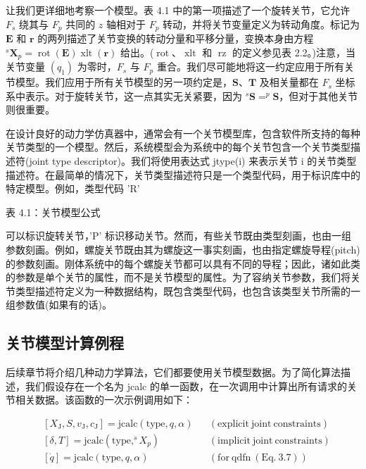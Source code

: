 \documentclass[10pt,a4paper]{book}
\theoremstyle{thmstyle} %
\theoremstyle{defstyle} %
\theoremstyle{prostyle} %
\begin{document}
让我们更详细地考察一个模型。表 4.1 中的第一项描述了一个旋转关节，它允许 $F_{s}$ 绕其与 $F_{p}$ 共同的 $z$ 轴相对于 $F_{p}$ 转动，并将关节变量定义为转动角度。标记为 $\boldsymbol{E}$ 和 $\boldsymbol{r}$ 的两列描述了关节变换的转动分量和平移分量，变换本身由方程 ${}^{s}\boldsymbol{X}_{p}=\operatorname{rot}(\boldsymbol{E}) \operatorname{xlt}(\boldsymbol{r})$ 给出。($\operatorname{rot}$、$\operatorname{xlt}$ 和 $\operatorname{rz}$ 的定义参见表 2.2。)注意，当关节变量 $(q_{1})$ 为零时，$F_{s}$ 与 $F_{p}$ 重合。我们尽可能地将这一约定应用于所有关节模型。我们应用于所有关节模型的另一项约定是，$\boldsymbol{S}$、$\boldsymbol{T}$ 及相关量都在 $F_{s}$ 坐标系中表示。对于旋转关节，这一点其实无关紧要，因为 ${}^{s}\boldsymbol{S}=^{p}\boldsymbol{S}$，但对于其他关节则很重要。



在设计良好的动力学仿真器中，通常会有一个关节模型库，包含软件所支持的每种关节类型的一个模型。然后，系统模型会为系统中的每个关节包含一个关节类型描述符(joint type descriptor)。我们将使用表达式 jtype(i) 来表示关节 i 的关节类型描述符。在最简单的情况下，关节类型描述符只是一个类型代码，用于标识库中的特定模型。例如，类型代码 'R'



表 4.1：关节模型公式





可以标识旋转关节，'P' 标识移动关节。然而，有些关节既由类型刻画，也由一组参数刻画。例如，螺旋关节既由其为螺旋这一事实刻画，也由指定螺旋导程(pitch)的参数刻画。刚体系统中的每个螺旋关节都可以具有不同的导程；因此，诸如此类的参数是单个关节的属性，而不是关节模型的属性。为了容纳关节参数，我们将关节类型描述符定义为一种数据结构，既包含类型代码，也包含该类型关节所需的一组参数值(如果有的话)。



\subsection{关节模型计算例程}





后续章节将介绍几种动力学算法，它们都要使用关节模型数据。为了简化算法描述，我们假设存在一个名为 jcalc 的单一函数，在一次调用中计算出所有请求的关节相关数据。该函数的一次示例调用如下：



$$
\begin{array}{rlrl} & { [X_{\mathrm{J}}, S, v_{\mathrm{J}}, c_{\mathrm{J}}] = \mathrm{jcalc}(\mathrm{type}, q, \alpha)} & & { \mathrm{(explicit~joint~constraints)} } \\& { [\delta, T] = \mathrm{jcalc}(\mathrm{type}, ^{s} X_{p})} & & { \mathrm{(implicit~joint~constraints)} } \\& { [\dot{q}] = \mathrm{jcalc}(\mathrm{type}, q, \alpha)} & & { \mathrm{(for~qdfn~(Eq.~3.7))} } \end{array}
$$
\end{document}
